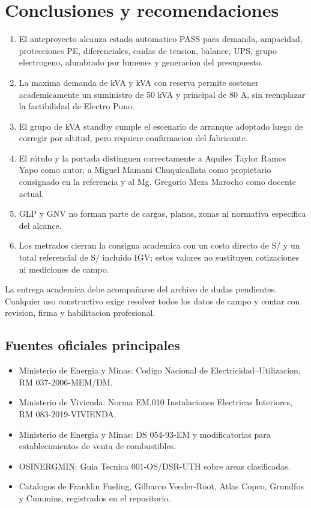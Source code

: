 \chapter{Conclusiones y recomendaciones}
\thispagestyle{memoria}\pagestyle{memoria}

\begin{enumerate}
  \item El anteproyecto alcanza estado automatico PASS para demanda, ampacidad, protecciones PE, diferenciales, caidas de tension, balance, UPS, grupo electrogeno, alumbrado por lumenes y generacion del presupuesto.
  \item La maxima demanda de \MaximaDemandaKVA{} kVA y \DemandaReservaKVA{} kVA con reserva permite sostener academicamente un suministro de 50 kVA y principal de 80 A, sin reemplazar la factibilidad de Electro Puno.
  \item El grupo de \GrupoSeleccionadoKVA{} kVA standby cumple el escenario de arranque adoptado luego de corregir por altitud, pero requiere confirmacion del fabricante.
  \item El rótulo y la portada distinguen correctamente a Aquiles Taylor Ramos Yapo como autor, a Miguel Mamani Chuquicallata como propietario consignado en la referencia y al Mg. Gregorio Meza Marocho como docente actual.
  \item GLP y GNV no forman parte de cargas, planos, zonas ni normativa especifica del alcance.
  \item Los metrados cierran la consigna academica con un costo directo de S/ \CostoDirecto{} y un total referencial de S/ \PresupuestoTotal{} incluido IGV; estos valores no sustituyen cotizaciones ni mediciones de campo.
\end{enumerate}

La entrega academica debe acompañarse del archivo de dudas pendientes. Cualquier uso constructivo exige resolver todos los datos de campo y contar con revision, firma y habilitacion profesional.

\section*{Fuentes oficiales principales}
\begin{itemize}
  \item Ministerio de Energia y Minas: Codigo Nacional de Electricidad--Utilizacion, RM 037-2006-MEM/DM.
  \item Ministerio de Vivienda: Norma EM.010 Instalaciones Electricas Interiores, RM 083-2019-VIVIENDA.
  \item Ministerio de Energia y Minas: DS 054-93-EM y modificatorias para establecimientos de venta de combustibles.
  \item OSINERGMIN: Guia Tecnica 001-OS/DSR-UTH sobre areas clasificadas.
  \item Catalogos de Franklin Fueling, Gilbarco Veeder-Root, Atlas Copco, Grundfos y Cummins, registrados en el repositorio.
\end{itemize}

